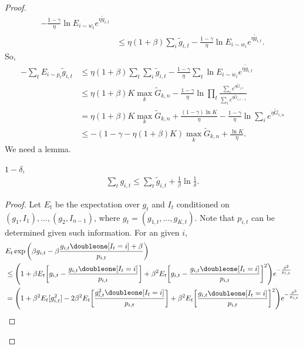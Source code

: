\begin{proof}
\begin{align}
                - \frac{1-\gamma}{\eta} \ln E_{i\sim w_t} e^{\eta\tilde g_{i,t}} \\
            &\le \eta(1+\beta) \sum_{i} \tilde g_{i, t}
                - \frac{1-\gamma}{\eta} \ln E_{i\sim w_t} e^{\eta\tilde g_{i,t}}.
    \end{align}
    So,
    \begin{align}
        -\sum_t E_{i\sim p_t}\tilde g_{i, t}
            &\le \eta(1+\beta)\sum_t\sum_i \tilde g_{i, t}
                - \frac{1-\gamma}{\eta}\sum_t \ln E_{i\sim w_t} e^{\eta\tilde g_{i,t}} \\
            &\le \eta(1+\beta)K\max_k \tilde G_{k,n}
                - \frac{1-\gamma}{\eta} \ln\prod_t\frac{\sum_i e^{\eta\tilde G_{i,t}}}{\sum_i e^{\eta\tilde G_{i,t-1}}} \\
            &= \eta(1+\beta)K\max_k \tilde G_{k,n} + \frac{(1-\gamma)\ln K}{\eta}
                - \frac{1-\gamma}{\eta} \ln\sum_i e^{\eta\tilde G_{i,n}} \\
            &\le -(1-\gamma-\eta(1+\beta)K)\max_k \tilde G_{k,n} + \frac{\ln K}{\eta}.
    \end{align}
    We need a lemma.
    \begin{lem}
        \wprob $1-\delta$,
        \begin{align}
            \sum_t g_{i,t}\le \sum_t \tilde g_{i,t} + \frac{1}{\beta}\ln \frac{1}{\delta}.
        \end{align}
    \end{lem}
    \begin{proof}
        Let $E_t$ be the expectation over $g_t$ and $I_t$ conditioned on
        $(g_1,I_1), \dots,(g_2,I_{n-1})$,
        where $g_t=(g_{1,t},\dots,g_{K,t})$.
        Note that $p_{i,t}$ can be determined given such information.
        For an given $i$,
        \begin{align}
            &E_t \exp\bigg(\beta g_{i,t}-\beta\frac{g_{i,t}\doubleone[I_t=i]+\beta}{p_{i,t}}\bigg) \\
            &\le\Bigg(1+\beta E_t\bigg[g_{i,t}-\frac{g_{i,t}\doubleone[I_t=i]}{p_{i,t}}\bigg]
                +\beta^2 E_t\bigg[g_{i,t}-\frac{g_{i,t}\doubleone[I_t=i]}{p_{i,t}}\bigg]^2\Bigg)e^{-\frac{\beta^2}{p_{i,t}}} \\
            &=\Bigg(1+\beta^2 E_t[g_{i,t}^2] - 2\beta^2 E_t\bigg[\frac{g_{i,t}^2\doubleone[I_t=i]}{p_{i,t}}\bigg]
                +\beta^2 E_t\bigg[\frac{g_{i,t}\doubleone[I_t=i]}{p_{i,t}}\bigg]^2\Bigg)e^{-\frac{\beta^2}{p_{i,t}}} \\

\end{align}
\end{proof}
\end{proof}
